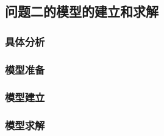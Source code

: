 \subsection{问题二的模型的建立和求解}

\subsubsection{具体分析}

\subsubsection{模型准备}

\subsubsection{模型建立}

\subsubsection{模型求解}
